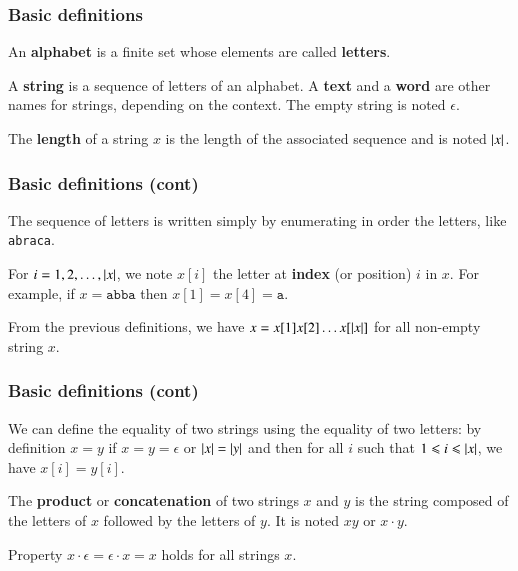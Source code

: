 
%
\begin{frame}
\frametitle{Basic definitions}

An \textbf{alphabet} is a finite set whose elements are called
\textbf{letters}.

\bigskip

A \textbf{string} is a sequence of letters of an alphabet. A
\textbf{text} and a \textbf{word} are other names for strings,
depending on the context. The empty string is noted \(\epsilon\).

\bigskip

The \textbf{length} of a string \(x\) is the length of the associated
sequence and is noted \(\lvert{x}\lvert{}\).

\end{frame}


%
\begin{frame}
\frametitle{Basic definitions (cont)}

The sequence of letters is written simply by enumerating in order the
letters, like \texttt{abraca}.

\bigskip

For \(i = 1, 2, \ldots, \lvert{x}\lvert{}\), we note \(x[i]\) the letter at
\textbf{index} (or position) \(i\) in \(x\). For example, if \(x =
\texttt{abba}\) then \(x[1] = x[4] = \texttt{a}\).

\bigskip

From the previous definitions, we have \(x = x[1] x[2] \ldots
x[\lvert{x}\lvert{}]\) for all non-empty string \(x\).

\end{frame}

%
\begin{frame}
\frametitle{Basic definitions (cont)}

We can define the equality of two strings using the equality of two
letters: by definition \(x = y\) if \(x = y = \epsilon\) or \(\lvert{x}\lvert{}
= \lvert{y}\lvert{}\) and then for all \(i\) such that \(1 \leqslant i \leqslant
\lvert{x}\lvert{}\), we have \(x[i] = y[i]\).

\bigskip

The \textbf{product} or \textbf{concatenation} of two strings \(x\)
and \(y\) is the string composed of the letters of \(x\) followed by
the letters of \(y\). It is noted \(xy\) or \(x \cdot y\).

\bigskip

Property \(x \cdot \epsilon = \epsilon \cdot x = x\) holds for all
strings \(x\).

\end{frame}


